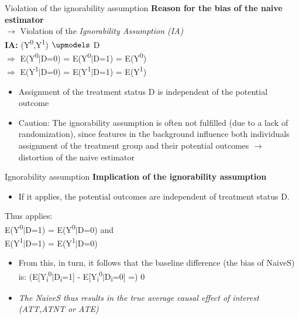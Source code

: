 \documentclass{beamer}\usepackage[]{graphicx}\usepackage[]{xcolor}
\begin{document}
\begin{frame}{Violation of the ignorability assumption}
\textbf{Reason for the bias of the naive estimator} 
\\
$\rightarrow$ Violation of the \textit{Ignorability Assumption (IA)} 
\\[1em]
\textbf{IA:} (Y\textsuperscript{0},Y\textsuperscript{1}) $\upmodels$ D 
\\
$\Rightarrow$ E(Y\textsuperscript{0}$\vert$D=0) = E(Y\textsuperscript{0}$\vert$D=1) = E(Y\textsuperscript{0}) 
\\
$\Rightarrow$ E(Y\textsuperscript{1}$\vert$D=0) = E(Y\textsuperscript{1}$\vert$D=1) = E(Y\textsuperscript{1})

\begin{itemize}
\item Assignment of the treatment status D is independent of the potential outcome
\item Caution: The ignorability assumption is often not fulfilled (due to a lack of randomization), since features in the background influence both individuals assignment of the treatment group and their potential outcomes $\rightarrow$ distortion of the naive estimator
\end{itemize}
\end{frame}


\begin{frame}{Ignorability assumption}
\textbf{Implication of the ignorability assumption}
\\[1em]
\begin{itemize}
  \item If it applies, the potential outcomes are independent of treatment status D.\\
\end{itemize}
Thus applies:
\\
E(Y\textsuperscript{0}$\vert$D=1) = E(Y\textsuperscript{0}$\vert$D=0) and 
\\
E(Y\textsuperscript{1}$\vert$D=1) = E(Y\textsuperscript{1}$\vert$D=0)
\\[1em]
\begin{itemize}
\item From this, in turn, it follows that the baseline difference (the bias of NaiveS) is: (E[Y\textsubscript{i}\textsuperscript{0}$\vert$D\textsubscript{i}=1] - E[Y\textsubscript{i}\textsuperscript{0}$\vert$D\textsubscript{i}=0] =) 0 
\item \textit{The NaiveS thus results in the true average causal effect of interest (ATT,ATNT or ATE)}
\end{itemize}

\end{frame}
\end{document}
